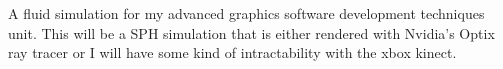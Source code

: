 A fluid simulation for my advanced graphics software development techniques unit. This will be a S\-P\-H simulation that is either rendered with Nvidia's Optix ray tracer or I will have some kind of intractability with the xbox kinect. 